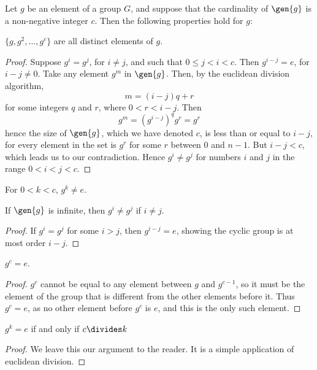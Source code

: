Let $g$ be an element of a group $G$, and suppose that the cardinality of $\gen{g}$ is a non-negative integer $c$. Then the following properties hold for $g$:

\begin{lemma} $\{ g, g^2, \dots, g^c \}$ are all distinct elements of $g$. \end{lemma}
\begin{proof}
    Suppose $g^i = g^j$, for $i \neq j$, and such that $0 \leq j < i < c$. Then $g^{i - j} = e$, for $i - j \neq 0$. Take any element $g^m$ in $\gen{g}$. Then, by the euclidean division algorithm,
    \[ m = (i - j)q + r \]
    for some integers $q$ and $r$, where $0 < r < i - j$. Then
    \[ g^m = (g^{i - j})^q g^r = g^r \]
    hence the size of $\gen{g}$, which we have denoted $c$, is less than or equal to $i - j$, for every element in the set is $g^r$ for some $r$ between 0 and $n-1$. But $i - j < c$, which leads us to our contradiction. Hence $g^i \neq g^j$ for numbers $i$ and $j$ in the range $0 < i < j < c$.
\end{proof}

\begin{corollary} For $0 < k < c$, $g^k \neq e$. \end{corollary}

\begin{corollary} If $\gen{g}$ is infinite, then $g^i \neq g^j$ if $i \neq j$. \end{corollary}
\begin{proof}
    If $g^i = g^j$ for some $i > j$, then $g^{i-j} = e$, showing the cyclic group is at most order $i - j$.
\end{proof}

\begin{corollary} $g^c = e$. \end{corollary}
\begin{proof} $g^c$ cannot be equal to any element between $g$ and $g^{c-1}$, so it must be the element of the group that is different from the other elements before it. Thus $g^c = e$, as no other element before $g^c$ is $e$, and this is the only such element. \end{proof}

\begin{lemma} $g^k = e$ if and only if $c \divides k$ \end{lemma}
\begin{proof} We leave this our argument to the reader. It is a simple application of euclidean division.
\end{proof}


